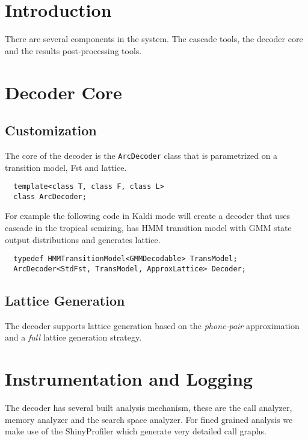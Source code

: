 \documentclass{article}
\begin{document}
\section{Introduction}
\label{sec:format}
There are several components in the system. The cascade tools, the decoder core
and the results post-processing tools.

\section{Decoder Core}
\label{sec:decodercore}

\subsection{Customization}
\label{sec:custom}
The core of the decoder is the \texttt{ArcDecoder} class that is parametrized on a transition
model, Fst  and lattice.
\begin{verbatim}
  template<class T, class F, class L>
  class ArcDecoder;
\end{verbatim}

For example the following code in Kaldi mode will create a decoder that uses
cascade in the tropical semiring, has HMM transition model with GMM state 
output distributions and generates lattice.

\begin{verbatim}
  typedef HMMTransitionModel<GMMDecodable> TransModel;
  ArcDecoder<StdFst, TransModel, ApproxLattice> Decoder;
\end{verbatim}





\subsection{Lattice Generation}
The decoder supports lattice generation based on the \emph{phone-pair}
approximation and a \emph{full} lattice generation strategy.

\section{Instrumentation and Logging}
\label{sec:instrumentation}
The decoder has several built analysis mechanism, these are the call analyzer,
memory analyzer and the search space analyzer. For fined grained analysis we 
make use of the ShinyProfiler which generate very detailed call graphs.
\end{document}
